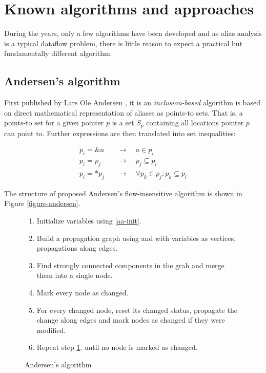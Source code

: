 \section{Known algorithms and approaches}

During the years, only a few algorithms have been developed and as alias
analysis is a typical dataflow problem, there is little reason to expect a
practical but fundamentally different algorithm.

\subsection{Andersen's algorithm}

First published by Lars Ole Andersen \cite{Andersen94}, it is an {\it
inclusion-based} algorithm is based on direct mathematical representation of
aliases as points-to sets. That is, a points-to set for a given pointer $p$ is a
set $S_p$ containing all locations pointer $p$ can point to.  Further
expressions are then translated into set inequalities:

\begin{align}
	\label{aa-init}
	p_i = \&a \quad &\to \quad a \in p_i \\
	\label{aa-prop}
	p_i = p_j \quad &\to \quad p_j \subseteq p_i \\
	\label{aa-deref}
	p_i = *p_j \quad &\to \quad \forall p_k \in p_j : p_k \subseteq p_i
\end{align}

The structure of proposed Andersen's flow-insensitive algorithm is shown in Figure
\ref{figure-andersen}.

\begin{figure}[h!]
\label{figure-andersen}
\begin{tcolorbox}
\begin{enumerate}
	\item Initialize variables using \ref{aa-init}.
	\item Build a propagation graph using \label{aa-prop} and \label{aa-deref}
		with variables as vertices, propagations along edges.
	\item Find strongly connected components in the grah and merge them into a single node.
	\item Mark every node as changed.
	\label{aa-propstep} 
	\item For every changed node, reset its changed status, propagate the change
		along edges and mark nodes as changed if they were modified.
	\item Repeat step \ref{aa-propstep}. until no node is marked as changed.
\end{enumerate}
\end{tcolorbox}
\caption{Andersen's algorithm}
\end{figure}

